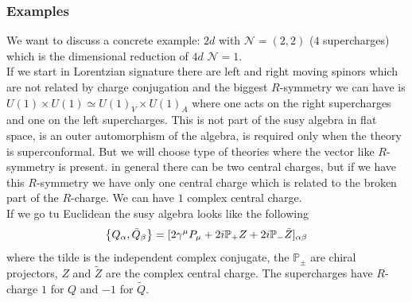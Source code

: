 \documentclass[11pt]{article}
\theoremstyle{definition}
\numberwithin{equation}{section}
\begin{document}
\subsubsection{Examples}
We want to discuss a concrete example: $2d$ with $\mathcal{N}=(2,2)$ ($4$ supercharges) which is the dimensional reduction of $4d$ $\mathcal{N}=1$.\\
If we start in Lorentzian signature there are left and right moving spinors which are not related by charge conjugation and the biggest $R$-symmetry we can have is $U(1)\times U(1)\simeq U(1)_{V}\times U(1)_{A}$ where one acts on the right supercharges and one on the left supercharges. This is not part of the susy algebra in flat space, is an outer automorphism of the algebra, is required only when the theory is superconformal. But we will choose type of theories where the vector like $R$-symmetry is present. in general there can be two central charges, but if we have this $R$-symmetry we have only one central charge which is related to the broken part of the $R$-charge. We can have $1$ complex central charge.\\
If we go tu Euclidean the susy algebra looks like the following
\begin{align}
	\acomm{Q_{\alpha}}{\tilde{Q}_{\beta}} = [2\gamma^{\mu}P_{\mu}+2i\mathbb{P}_{+}Z+2i\mathbb{P}_{-}\tilde{Z}]_{\alpha\beta}
\end{align}
where the tilde is the independent complex conjugate, the $\mathbb{P}_{\pm}$ are chiral projectors, $Z$ and $\tilde{Z}$ are the complex central charge. The supercharges have $R$-charge $1$ for $Q$ and $-1$ for $\tilde{Q}$.\\
\end{document}
